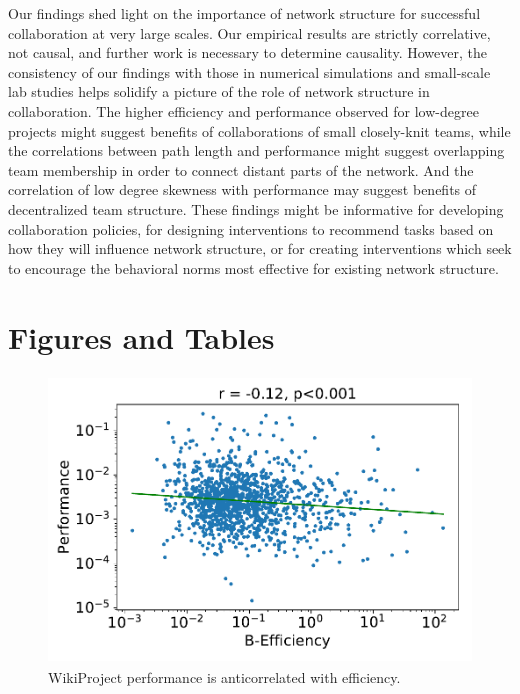 \documentclass[a4paper,12pt]{article}
\newcommand{\+}{\phantom{-}}
\begin{document}
Our findings shed light on the importance of network structure for successful
collaboration at very large scales.
Our empirical results are strictly correlative, not causal,
and further work is necessary to determine causality.
However, the consistency of our findings with those in numerical simulations
and small-scale lab studies helps solidify a picture of the role of network
structure in collaboration.
The higher efficiency and performance observed for low-degree projects might
suggest benefits of collaborations of small closely-knit teams,
while the correlations between path length and performance might suggest
overlapping team membership in order to connect distant parts of the network.
And the correlation of low degree skewness with performance may suggest
benefits of decentralized team structure.
These findings might be informative for developing collaboration policies,
for designing interventions to recommend tasks based on how they will
influence network structure,
or for creating interventions which seek to encourage the behavioral norms most
effective for existing network structure.




\section*{Figures and Tables}

\begin{figure}[H]
\centering
\includegraphics[width=4.5in,height=3in]{fig-perf-eff.pdf}
\caption{
WikiProject performance is anticorrelated with efficiency.
\label{fig:eff-perf}
}
\end{figure}
\end{document}
